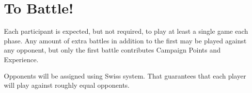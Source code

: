 \section{To Battle!}

Each participant is expected, but not required, to play at least a single game each phase. 
Any amount of extra battles in addition to the first may be played against any opponent, 
but only the first battle contributes Campaign Points and Experience.

Opponents will be assigned using Swiss system. That guarantees that each player will play against roughly equal opponents.
